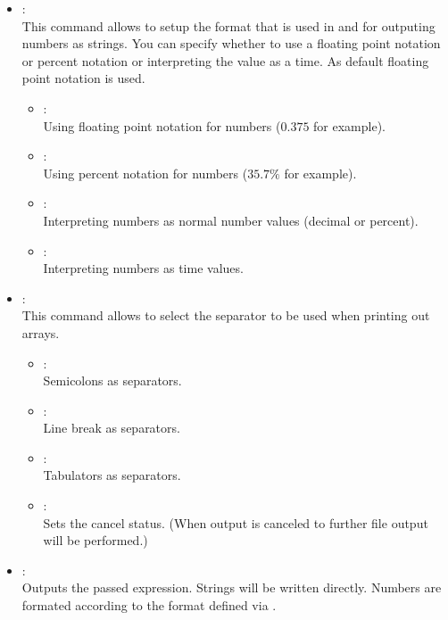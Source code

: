 \begin{itemize}

\item
{}:\\
This command allows to setup the format that is used in  and 
for outputing numbers as strings. You can specify whether to use a floating point notation or percent notation or interpreting
the value as a time. As default floating point notation is used.

\begin{itemize}
\item
{}:\\
Using floating point notation for numbers ($0.375$ for example).
\item
{}:\\
Using percent notation for numbers ($35.7\%$ for example).
\item
{}:\\
Interpreting numbers as normal number values (decimal or percent).
\item
{}:\\
Interpreting numbers as time values.
\end{itemize}

\item
{}:\\
This command allows to select the separator to be used when printing out arrays.
\begin{itemize}

\item
{}:\\
Semicolons as separators.

\item
{}:\\
Line break as separators.

\item
{}:\\
Tabulators as separators.

\item
{}:\\
Sets the cancel status. (When output is canceled to further file output will be performed.)
\end{itemize}

\item
{}:\\
Outputs the passed expression.
Strings will be written directly. Numbers are formated according to the format
defined via .


\end{itemize}
